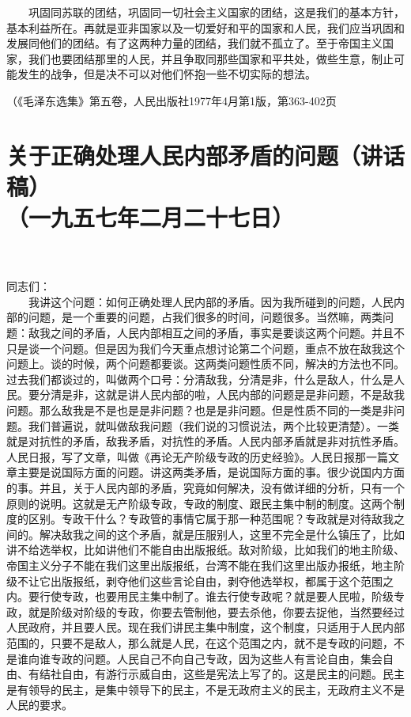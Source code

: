 \documentclass[cn,11pt,chinese]{elegantbook}
\def\myformat#1{\hfil\hfil #1}
\begin{document}
　　巩固同苏联的团结，巩固同一切社会主义国家的团结，这是我们的基本方针，基本利益所在。再就是亚非国家以及一切爱好和平的国家和人民，我们应当巩固和发展同他们的团结。有了这两种力量的团结，我们就不孤立了。至于帝国主义国家，我们也要团结那里的人民，并且争取同那些国家和平共处，做些生意，制止可能发生的战争，但是决不可以对他们怀抱一些不切实际的想法。\\
\begin{flushright}（《毛泽东选集》第五卷，人民出版社1977年4月第1版，第363-402页\end{flushright}
\newpage\section*{\myformat{关于正确处理人民内部矛盾的问题（讲话稿）}\\\myformat{（一九五七年二月二十七日）}}\\~~\\
同志们：\\
　　我讲这个问题：如何正确处理人民内部的矛盾。因为我所碰到的问题，人民内部的问题，是一个重要的问题，占我们很多的时间，问题很多。当然嘛，两类问题：敌我之间的矛盾，人民内部相互之间的矛盾，事实是要谈这两个问题。并且不只是谈一个问题。但是因为我们今天重点想讨论第二个问题，重点不放在敌我这个问题上。谈的时候，两个问题都要谈。这两类问题性质不同，解决的方法也不同。过去我们都谈过的，叫做两个口号：分清敌我，分清是非，什么是敌人，什么是人民。要分清是非，这就是讲人民内部的啦，人民内部的问题是是非问题，不是敌我问题。那么敌我是不是也是是非问题？也是是非问题。但是性质不同的一类是非问题。我们普遍说，就叫做敌我问题（我们说的习惯说法，两个比较更清楚）。一类就是对抗性的矛盾，敌我矛盾，对抗性的矛盾。人民内部矛盾就是非对抗性矛盾。人民日报，写了文章，叫做《再论无产阶级专政的历史经验》。人民日报那一篇文章主要是说国际方面的问题。讲这两类矛盾，是说国际方面的事。很少说国内方面的事。并且，关于人民内部的矛盾，究竟如何解决，没有做详细的分析，只有一个原则的说明。这就是无产阶级专政，专政的制度、跟民主集中制的制度。这两个制度的区别。专政干什么？专政管的事情它属于那一种范围呢？专政就是对待敌我之间的。解决敌我之间的这个矛盾，就是压服别人，这里不完全是什么镇压了，比如讲不给选举权，比如讲他们不能自由出版报纸。敌对阶级，比如我们的地主阶级、帝国主义分子不能在我们这里出版报纸，台湾不能在我们这里出版办报纸，地主阶级不让它出版报纸，剥夺他们这些言论自由，剥夺他选举权，都属于这个范围之内。要行使专政，也要用民主集中制了。谁去行使专政呢？就是要人民啦，阶级专政，就是阶级对阶级的专政，你要去管制他，要去杀他，你要去捉他，当然要经过人民政府，并且要人民。现在我们讲民主集中制度，这个制度，只适用于人民内部范围的，只要不是敌人，那么就是人民，在这个范围之内，就不是专政的问题，不是谁向谁专政的问题。人民自己不向自己专政，因为这些人有言论自由，集会自由、有结社自由，有游行示威自由，这些是宪法上写了的。这是民主的问题。民主是有领导的民主，是集中领导下的民主，不是无政府主义的民主，无政府主义不是人民的要求。\\
\end{document}
